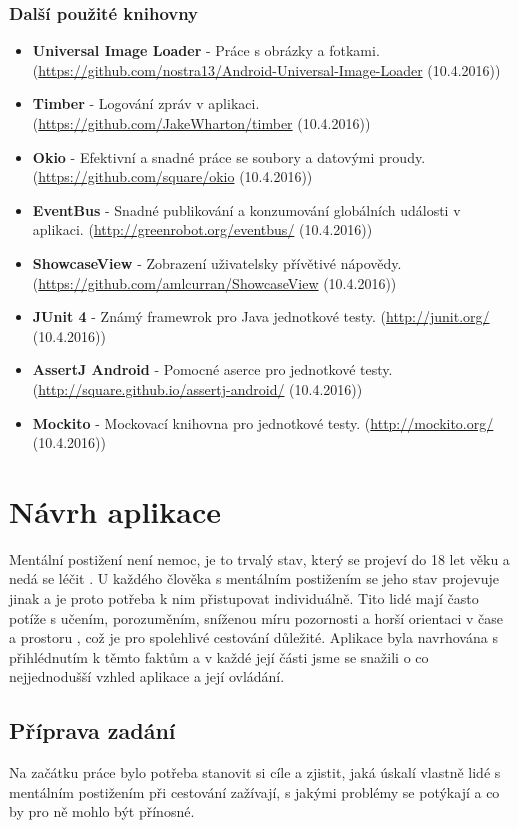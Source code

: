 \documentclass[czech,master,public,dept460,male,java,cpdeclaration]{diploma}
\begin{document}
\subsubsection{Další použité knihovny}
\begin{itemize}
  \item \textbf{Universal Image Loader} - Práce s obrázky a fotkami. (\url{https://github.com/nostra13/Android-Universal-Image-Loader}  (10.4.2016))
  \item \textbf{Timber} - Logování zpráv v aplikaci. (\url{https://github.com/JakeWharton/timber}  (10.4.2016))
  \item \textbf{Okio} - Efektivní a snadné práce se soubory a datovými proudy. (\url{https://github.com/square/okio}  (10.4.2016))
  \item \textbf{EventBus} - Snadné publikování a konzumování globálních události v aplikaci. (\url{http://greenrobot.org/eventbus/}  (10.4.2016))
  \item \textbf{ShowcaseView} - Zobrazení uživatelsky přívětivé nápovědy. (\url{https://github.com/amlcurran/ShowcaseView}  (10.4.2016))
  \item \textbf{JUnit 4} - Známý framewrok pro Java jednotkové testy. (\url{http://junit.org/}  (10.4.2016))
  \item \textbf{AssertJ Android} - Pomocné aserce pro jednotkové testy. (\url{http://square.github.io/assertj-android/}  (10.4.2016))
  \item \textbf{Mockito} - Mockovací knihovna pro jednotkové testy. (\url{http://mockito.org/}  (10.4.2016))


\end{itemize}

\section{Návrh aplikace}
Mentální postižení není nemoc, je to trvalý stav, který se projeví do 18 let věku a nedá se léčit \cite{komunikace}.
U každého člověka s mentálním postižením se jeho stav projevuje jinak a je proto potřeba k nim
přistupovat individuálně. Tito lidé mají často potíže s učením, porozuměním, sníženou míru pozornosti
a horší orientaci v čase a prostoru \cite{komunikace}, což je pro spolehlivé cestování důležité.
Aplikace byla navrhována s přihlédnutím k těmto faktům a v každé její části jsme se snažili o co nejjednodušší
vzhled aplikace a její ovládání.


\subsection{Příprava zadání}
Na začátku práce bylo potřeba stanovit si cíle a zjistit, jaká úskalí vlastně lidé s mentálním
postižením při cestování zažívají, s jakými problémy se potýkají a co by pro ně mohlo být přínosné.
\end{document}
